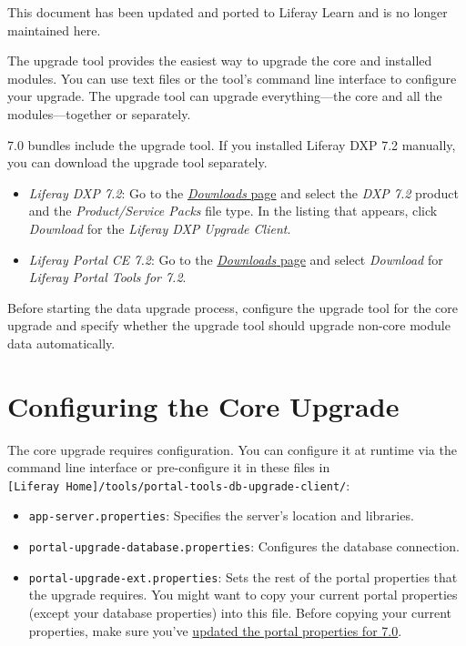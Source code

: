 {This document has been updated and ported to Liferay Learn and is no
longer maintained here.}

The upgrade tool provides the easiest way to upgrade the core and
installed modules. You can use text files or the tool's command line
interface to configure your upgrade. The upgrade tool can upgrade
everything---the core and all the modules---together or separately.

7.0 bundles include the upgrade tool. If you installed Liferay DXP 7.2
manually, you can download the upgrade tool separately.

\begin{itemize}
\item
  \emph{Liferay DXP 7.2}: Go to the
  \href{https://customer.liferay.com/group/customer/downloads}{\emph{Downloads}
  page} and select the \emph{DXP 7.2} product and the
  \emph{Product/Service Packs} file type. In the listing that appears,
  click \emph{Download} for the \emph{Liferay DXP Upgrade Client}.
\item
  \emph{Liferay Portal CE 7.2}: Go to the
  \href{https://www.liferay.com/downloads-community}{\emph{Downloads}
  page} and select \emph{Download} for \emph{Liferay Portal Tools for
  7.2}.
\end{itemize}

Before starting the data upgrade process, configure the upgrade tool for
the core upgrade and specify whether the upgrade tool should upgrade
non-core module data automatically.

\section{Configuring the Core
Upgrade}\label{configuring-the-core-upgrade}

The core upgrade requires configuration. You can configure it at runtime
via the command line interface or pre-configure it in these files in
\texttt{{[}Liferay\ Home{]}/tools/portal-tools-db-upgrade-client/}:

\begin{itemize}
\tightlist
\item
  \texttt{app-server.properties}: Specifies the server's location and
  libraries.
\item
  \texttt{portal-upgrade-database.properties}: Configures the database
  connection.
\item
  \texttt{portal-upgrade-ext.properties}: Sets the rest of the portal
  properties that the upgrade requires. You might want to copy your
  current portal properties (except your database properties) into this
  file. Before copying your current properties, make sure you've
  \href{/docs/7-2/deploy/-/knowledge_base/d/preparing-to-upgrade-the-product-database}{updated
  the portal properties for 7.0}.
\end{itemize}

